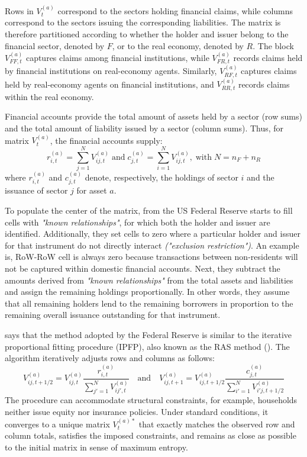 Rows in $V_t^{(a)}$ correspond to the sectors holding financial claims, while columns correspond to the sectors issuing the corresponding liabilities. The matrix is therefore partitioned according to whether the holder and issuer belong to the financial sector, denoted by $F$, or to the real economy, denoted by $R$. The block $V_{FF,t}^{(a)}$ captures claims among financial institutions, while $V_{FR,t}^{(a)}$ records claims held by financial institutions on real-economy agents. Similarly, $V_{RF,t}^{(a)}$ captures claims held by real-economy agents on financial institutions, and $V_{RR,t}^{(a)}$ records claims within the real economy.

Financial accounts provide the total amount of assets held by a sector (row sums) and the total amount of liability issued by a sector (column sums). Thus, for matrix $V_{t}^{(a)}$, the financial accounts supply: 
\begin{equation}
r^{(a)}_{i,t} = \sum_{j=1}^{N} V^{(a)}_{ij,t}
\; \text{and} \;
c^{(a)}_{j,t} = \sum_{i=1}^{N} V^{(a)}_{ij,t},
\; \text{with} \; N = n_F + n_R
\end{equation}
where $r^{(a)}_{i,t}$ and $c^{(a)}_{j,t}$ denote, respectively, the holdings of sector $i$ and the issuance of sector $j$ for asset $a$. 

To populate the center of the matrix, \textcite{batty_-whom--whom_2023} from the US Federal Reserve starts to fill cells with \textit{"known relationships"}, for which both the holder and issuer are identified. Additionally, they set cells to zero where a particular holder and issuer for that instrument do not directly interact \textit{("exclusion restriction")}. An example is, RoW-RoW cell is always zero because transactions between non-residents will not be captured within domestic financial accounts. Next, they subtract the amounts derived from \textit{"known relationships"} from the total assets and liabilities and assign the remaining holdings proportionally. In other words, they assume that all remaining holders lend to the remaining borrowers in proportion to the remaining overall issuance outstanding for that instrument.      

\textcite{jondeau_environmental_2026} says that the method adopted by the Federal Reserve is similar to the iterative proportional fitting procedure (IPFP), also known as the RAS method (\cite{bacharach_estimating_1965}). The algorithm iteratively adjusts rows and columns as follows:
\begin{equation}
V^{(a)}_{ij,t+1/2}
=
V^{(a)}_{ij,t}
\frac{r^{(a)}_{i,t}}{\sum_{j'=1}^{N} V^{(a)}_{ij',t}}
\quad \text{and} \quad
V^{(a)}_{ij,t+1}
=
V^{(a)}_{ij,t+1/2}
\frac{c^{(a)}_{j,t}}{\sum_{i'=1}^{N} V^{(a)}_{i'j,t+1/2}}
\end{equation}
The procedure can accommodate structural constraints, for example, households neither issue equity nor insurance policies. Under standard conditions, it converges to a unique matrix $V^{(a)*}_{t}$ that exactly matches the observed row and column totals, satisfies the imposed constraints, and remains as close as possible to the initial matrix in sense of maximum entropy.

